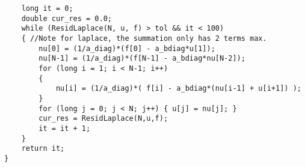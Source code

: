 \documentclass[12pt]{article}
\begin{document}
\begin{verbatim}
    long it = 0;
    double cur_res = 0.0;
    while (ResidLaplace(N, u, f) > tol && it < 100)
    { //Note for laplace, the summation only has 2 terms max.
        nu[0] = (1/a_diag)*(f[0] - a_bdiag*u[1]);
        nu[N-1] = (1/a_diag)*(f[N-1] - a_bdiag*nu[N-2]);
        for (long i = 1; i < N-1; i++)
        {
            nu[i] = (1/a_diag)*( f[i] - a_bdiag*(nu[i-1] + u[i+1]) );
        }
        for (long j = 0; j < N; j++) { u[j] = nu[j]; }
        cur_res = ResidLaplace(N,u,f);
        it = it + 1;
    }
    return it;
}
\end{verbatim}
\end{document}
